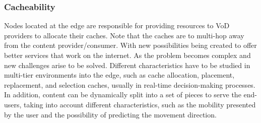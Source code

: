 \subsubsection{Cacheability}


Nodes located at the edge are responsible for providing resources to VoD providers to allocate their caches.  Note that the caches are to multi-hop away from the content provider/consumer. 
With new possibilities being created to offer better services that work on the internet. As the problem becomes complex and new challenges arise to be solved. Different characteristics have to be studied in multi-tier environments into the edge, such as cache allocation, placement, replacement, and selection caches, usually in real-time decision-making processes. In addition, content can be dynamically split into a set of pieces to serve the end-users, taking into account different characteristics, such as the mobility presented by the user and the possibility of predicting the movement direction. 

